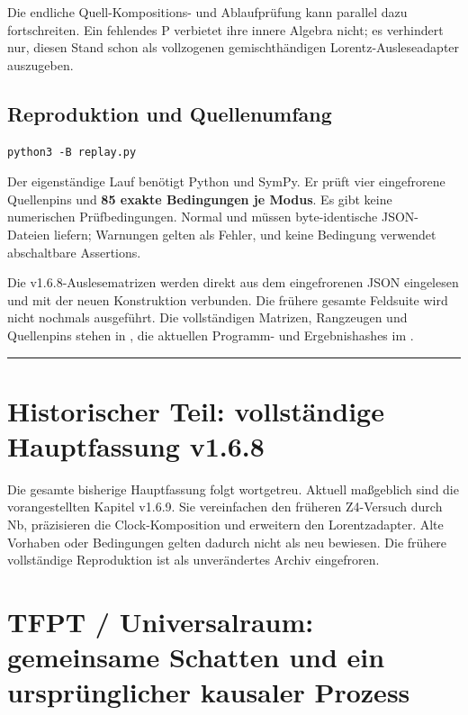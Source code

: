 Die endliche Quell-Kompositions- und Ablaufprüfung kann parallel dazu
fortschreiten. Ein fehlendes P verbietet ihre innere Algebra nicht; es
verhindert nur, diesen Stand schon als vollzogenen gemischthändigen
Lorentz-Ausleseadapter auszugeben.

\subsection{Reproduktion und
Quellenumfang}\label{reproduktion-und-quellenumfang}

\begin{verbatim}
python3 -B replay.py
\end{verbatim}

Der eigenständige Lauf benötigt Python und SymPy. Er prüft vier
eingefrorene Quellenpins und \textbf{85 exakte Bedingungen je Modus}. Es
gibt keine numerischen Prüfbedingungen. Normal und  müssen
byte-identische JSON-Dateien liefern; Warnungen gelten als Fehler, und
keine Bedingung verwendet abschaltbare Assertions.

Die v1.6.8-Auslesematrizen werden direkt aus dem eingefrorenen JSON
eingelesen und mit der neuen Konstruktion verbunden. Die frühere gesamte
Feldsuite wird nicht nochmals ausgeführt. Die vollständigen Matrizen,
Rangzeugen und Quellenpins stehen in , die
aktuellen Programm- und Ergebnishashes im
.

\begin{center}\rule{0.5\linewidth}{0.5pt}\end{center}

\section{Historischer Teil: vollständige Hauptfassung
v1.6.8}\label{historischer-teil-vollstuxe4ndige-hauptfassung-v1.6.8}

Die gesamte bisherige Hauptfassung folgt wortgetreu. Aktuell maßgeblich
sind die vorangestellten Kapitel v1.6.9. Sie vereinfachen den früheren
Z4-Versuch durch Nb, präzisieren die Clock-Komposition und erweitern den
Lorentzadapter. Alte Vorhaben oder Bedingungen gelten dadurch nicht als
neu bewiesen. Die frühere vollständige Reproduktion ist als
unverändertes Archiv eingefroren.

\section{TFPT / Universalraum: gemeinsame Schatten und ein
ursprünglicher kausaler
Prozess}\label{tfpt-universalraum-gemeinsame-schatten-und-ein-urspruxfcnglicher-kausaler-prozess}

